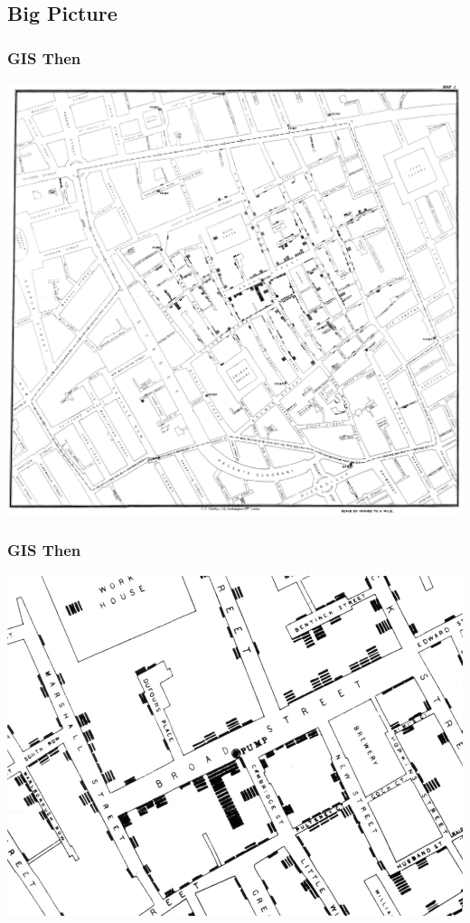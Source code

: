 \documentclass[nototal]{beamer}
\begin{document}
\subsection{Big Picture} 

\begin{frame}
	\frametitle{GIS Then}
 \begin{center}
 \includegraphics[width=.85\linewidth]{snowmap1.pdf}
  \end{center}
 \end{frame} 

\begin{frame}
	\frametitle{GIS Then}
 \begin{center}
 \includegraphics[width=.85\linewidth]{snowmap3.png}
  \end{center}
 \end{frame} 
\end{document}
